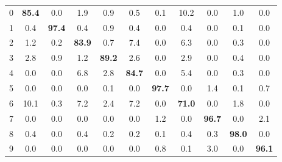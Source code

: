 \documentclass{article}
\begin{document}
\begin{table}[hbt!]
\begin{subtable}{0.5\linewidth}
\begin{tabular}{c| c c c c c c c c c c |}
          \hline
            0 & \textbf{85.4} & 0.0 & 1.9 & 0.9 & 0.5 & 0.1 & 10.2 & 0.0 & 1.0 & 0.0 \\
            1 & 0.4 & \textbf{97.4} & 0.4 & 0.9 & 0.4 & 0.0 & 0.4 & 0.0 & 0.1 & 0.0 \\
            2 & 1.2 & 0.2 & \textbf{83.9} & 0.7 & 7.4 & 0.0 & 6.3 & 0.0 & 0.3 & 0.0 \\
            3 & 2.8 & 0.9 & 1.2 & \textbf{89.2} & 2.6 & 0.0 & 2.9 & 0.0 & 0.4 & 0.0 \\
            4 & 0.0 & 0.0 & 6.8 & 2.8 & \textbf{84.7} & 0.0 & 5.4 & 0.0 & 0.3 & 0.0 \\
            5 & 0.0 & 0.0 & 0.0 & 0.1 & 0.0 & \textbf{97.7} & 0.0 & 1.4 & 0.1 & 0.7 \\
            6 & 10.1 & 0.3 & 7.2 & 2.4 & 7.2 & 0.0 & \textbf{71.0} & 0.0 & 1.8 & 0.0 \\
            7 & 0.0 & 0.0 & 0.0 & 0.0 & 0.0 & 1.2 & 0.0 & \textbf{96.7} & 0.0 & 2.1 \\
            8 & 0.4 & 0.0 & 0.4 & 0.2 & 0.2 & 0.1 & 0.4 & 0.3 & \textbf{98.0} & 0.0 \\
            9 & 0.0 & 0.0 & 0.0 & 0.0 & 0.0 & 0.8 & 0.1 & 3.0 & 0.0 & \textbf{96.1}
        \end{tabular}
         \label{tab:fmnist2}
  \end{subtable}

\end{table}
\end{document}
